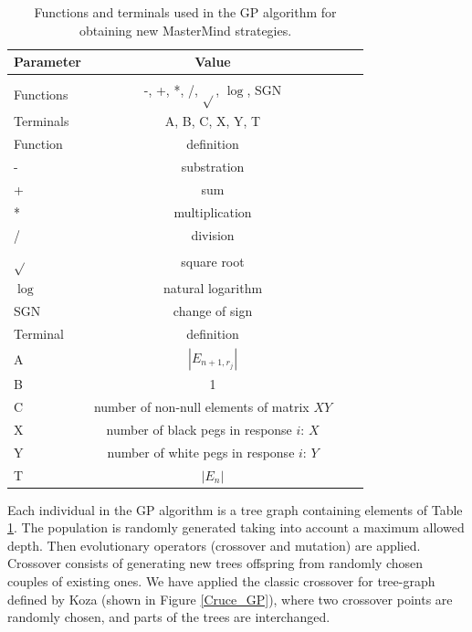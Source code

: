 \begin{table}[h!]
\centering
\caption{Functions and terminals used in the GP algorithm for obtaining new MasterMind strategies. \label{tab:GPparams}}
\begin{tabular}{lccc}
\hline
Parameter & Value \\
\hline \\
Functions  & -, +, *, /, $\sqrt{}$, $\log$, SGN\\
Terminals & A, B, C, X, Y, T\\
\hline
\hline
Function & definition\\
\hline
- & substration\\
+ & sum\\
* & multiplication\\
/ & division\\
$\sqrt{}$ & square root\\
$\log$ & natural logarithm\\
SGN & change of sign\\
\hline
\hline
Terminal & definition\\
\hline
A & $|E_{n+1,r_j}|$\\
B & 1 \\
C & number of non-null elements of matrix $XY$\\
X & number of black pegs in response $i$: $X$\\
Y & number of white pegs in response $i$: $Y$\\
T & $|E_{n}|$\\
\hline
\end{tabular}
\end{table}

Each individual in the GP algorithm is a tree graph containing
elements of Table \ref{tab:GPparams}. The population is randomly
generated taking into account a maximum allowed depth. Then
evolutionary operators (crossover and mutation) are applied. Crossover
consists of generating new trees offspring from randomly chosen
couples of existing ones. We have applied the classic crossover for
tree-graph defined by Koza \cite{} %
 (shown in Figure \ref{Cruce_GP}), where two crossover points are randomly chosen, and parts of the trees are interchanged.

